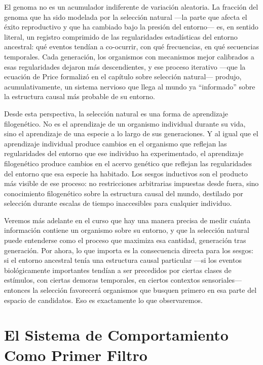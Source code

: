 \documentclass[
  letterpaper,
  DIV=11,
  numbers=noendperiod]{scrreprt}
\begin{document}
\begin{tcolorbox}[enhanced jigsaw, arc=.35mm, bottomrule=.15mm, breakable, colback=white, colframe=quarto-callout-note-color-frame, left=2mm, leftrule=.75mm, opacityback=0, rightrule=.15mm, toprule=.15mm]
El genoma no es un acumulador indiferente de variación aleatoria. La
fracción del genoma que ha sido modelada por la selección natural ---la
parte que afecta el éxito reproductivo y que ha cambiado bajo la presión
del entorno--- es, en sentido literal, un registro comprimido de las
regularidades estadísticas del entorno ancestral: qué eventos tendían a
co-ocurrir, con qué frecuencias, en qué secuencias temporales. Cada
generación, los organismos con mecanismos mejor calibrados a esas
regularidades dejaron más descendientes, y ese proceso iterativo ---que
la ecuación de Price formalizó en el capítulo sobre selección natural---
produjo, acumulativamente, un sistema nervioso que llega al mundo ya
``informado'' sobre la estructura causal más probable de su entorno.

Desde esta perspectiva, la selección natural es una forma de aprendizaje
filogenético. No es el aprendizaje de un organismo individual durante su
vida, sino el aprendizaje de una especie a lo largo de sus generaciones.
Y al igual que el aprendizaje individual produce cambios en el organismo
que reflejan las regularidades del entorno que ese individuo ha
experimentado, el aprendizaje filogenético produce cambios en el acervo
genético que reflejan las regularidades del entorno que esa especie ha
habitado. Los sesgos inductivos son el producto más visible de ese
proceso: no restricciones arbitrarias impuestas desde fuera, sino
conocimiento filogenético sobre la estructura causal del mundo,
destilado por selección durante escalas de tiempo inaccesibles para
cualquier individuo.

Veremos más adelante en el curso que hay una manera precisa de medir
cuánta información contiene un organismo sobre su entorno, y que la
selección natural puede entenderse como el proceso que maximiza esa
cantidad, generación tras generación. Por ahora, lo que importa es la
consecuencia directa para los sesgos: si el entorno ancestral tenía una
estructura causal particular ---si los eventos biológicamente
importantes tendían a ser precedidos por ciertas clases de estímulos,
con ciertas demoras temporales, en ciertos contextos sensoriales---
entonces la selección favorecerá organismos que busquen primero en esa
parte del espacio de candidatos. Eso es exactamente lo que observaremos.

\section{El Sistema de Comportamiento Como Primer
Filtro}\label{el-sistema-de-comportamiento-como-primer-filtro}


\end{tcolorbox}
\end{document}
